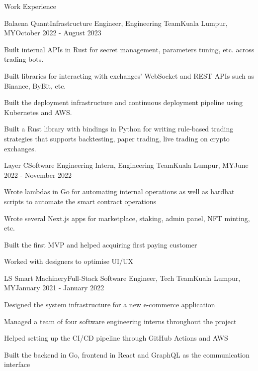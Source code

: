 \documentclass{article}
\newlength{\tabin}
\newlength{\secsep}
\newcommand{\lineunder}{\vspace*{-8pt} \\ \hspace*{-6pt} \hrulefill \\ \vspace*{-15pt}}
\newenvironment{tabbedsection}[1]{
  \begin{list}{}{
      \setlength{\itemsep}{0pt}
      \setlength{\labelsep}{0pt}
      \setlength{\labelwidth}{0pt}
      \setlength{\leftmargin}{\tabin}
      \setlength{\rightmargin}{\tabin}
      \setlength{\listparindent}{0pt}
      \setlength{\parsep}{0pt}
      \setlength{\parskip}{0pt}
      \setlength{\partopsep}{0pt}
      \setlength{\topsep}{#1}
    }
  \item[]
}{\end{list}}
\newenvironment{resume_section}[1]{
  \filbreak
  \vspace{2\secsep}
  \textsc{\large#1}
  \lineunder
  \begin{tabbedsection}{\secsep}
}{\end{tabbedsection}}
\newenvironment{subitems}{
  \renewcommand{\labelitemi}{-}
  \begin{itemize}
      \setlength{\labelsep}{1em}
}{\end{itemize}}
\newenvironment{resume_employer}[4]{
  \vspace{\secsep}
  \textbf{#1} \\ 
  \indent {\small #2} \hfill {\footnotesize#3 (#4)}
  \begin{tabbedsection}{0pt}
  \begin{subitems}
}{\end{subitems}\end{tabbedsection}}
\begin{document}
\begin{resume_section}{Work Experience}
  \begin{resume_employer}{Balaena Quant}{Infrastructure Engineer, Engineering Team}{Kuala Lumpur, MY}{October 2022 - August 2023}
    \item Built internal APIs in Rust for secret management, parameters tuning, etc. across trading bots.
    \item Built libraries for interacting with exchanges' WebSocket and REST APIs such as Binance, ByBit, etc.
    \item Built the deployment infrastructure and continuous deployment pipeline using Kubernetes and AWS.
    \item Built a Rust library with bindings in Python for writing rule-based trading strategies that supports backtesting, paper trading, live trading on crypto exchanges.
  \end{resume_employer}

  \begin{resume_employer}{Layer C}{Software Engineering Intern, Engineering Team}{Kuala Lumpur, MY}{June 2022 - November 2022}
    \item Wrote lambdas in Go for automating internal operations as well as hardhat scripts to automate the smart contract operations
    \item Wrote several Next.js apps for marketplace, staking, admin panel, NFT minting, etc.
    \item Built the first MVP and helped acquiring first paying customer
    \item Worked with designers to optimise UI/UX
  \end{resume_employer}

  \begin{resume_employer}{LS Smart Machinery}{Full-Stack Software Engineer, Tech Team}{Kuala Lumpur, MY}{January 2021 - January 2022}
    \item Designed the system infrastructure for a new e-commerce application
    \item Managed a team of four software engineering interns throughout the project
    \item Helped setting up the CI/CD pipeline through GitHub Actions and AWS
    \item Built the backend in Go, frontend in React and GraphQL as the communication interface
  \end{resume_employer}
\end{resume_section}
\end{document}
